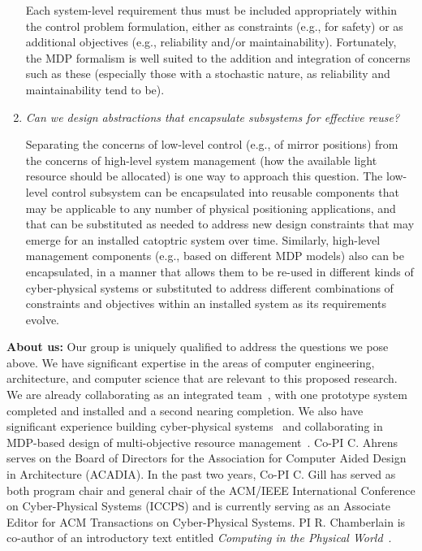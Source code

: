 \begin{enumerate}
Each system-level requirement thus must be included appropriately within
the control problem formulation, either as constraints (e.g., for
safety) or as additional objectives (e.g., reliability and/or maintainability).
Fortunately, the MDP formalism is well suited to the addition and integration 
of concerns such as these (especially those with a stochastic nature, as reliability
and maintainability tend to be).

\item \emph{Can we design abstractions that encapsulate subsystems for
effective reuse?}

Separating the concerns of low-level control (e.g., of mirror positions) from
the concerns of high-level system management (how the available light resource 
should be  allocated) is one way to approach this question.  The low-level control 
subsystem can be encapsulated into reusable components that may be applicable to 
any number of physical positioning applications, and that can be substituted as
needed to address new design constraints that may emerge for an installed catoptric 
system over time.  Similarly, high-level management components (e.g., based on 
different MDP models) also can be encapsulated, in a manner that allows them to be 
re-used in different kinds of cyber-physical systems or substituted to address 
different combinations of constraints and objectives within an installed system 
as its requirements evolve.

\end{enumerate}

\noindent
{\bf About us:}
Our group is uniquely qualified to address the questions we pose above.
We have significant expertise in the areas of computer engineering, architecture, 
and computer science that are relevant to this proposed research. We are already 
collaborating as an integrated team~\cite{cag18}, with one prototype system 
completed and installed and a second nearing completion.  We also have significant 
experience building cyber-physical systems~\cite{cew18,wgl17} and collaborating in 
MDP-based design of multi-objective resource management~\cite{mgc16}.
Co-PI C. Ahrens serves on the Board of Directors for the
Association for Computer Aided Design in Architecture (ACADIA).
In the past two years, Co-PI C. Gill has served as both program
chair and general chair of the ACM/IEEE International
Conference on Cyber-Physical Systems (ICCPS) and is currently
serving as an Associate Editor for ACM Transactions on Cyber-Physical
Systems.
PI R. Chamberlain is co-author of an introductory text entitled {\it Computing
in the Physical World}~\cite{cc17}.
